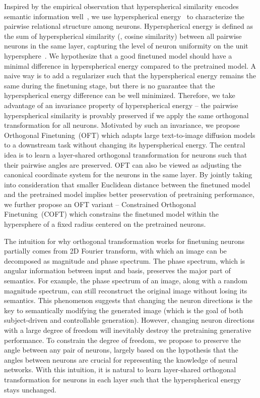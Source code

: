 Inspired by the empirical observation that hyperspherical similarity encodes semantic information well~\cite{liu2017deep,liu2018decoupled,chen2020angular}, we use hyperspherical energy~\cite{liu2018learning} to characterize the pairwise relational structure among neurons. Hyperspherical energy is defined as the sum of hyperspherical similarity (\eg, cosine similarity) between all pairwise neurons in the same layer, capturing the level of neuron uniformity on the unit hypersphere~\cite{liu2021learning}. We hypothesize that a good finetuned model should have a minimal difference in hyperspherical energy compared to the pretrained model. A naive way is to add a regularizer such that the hyperspherical energy remains the same during the finetuning stage, but there is no guarantee that the hyperspherical energy difference can be well minimized. Therefore, we take advantage of an invariance property of hyperspherical energy -- the pairwise hyperspherical similarity is provably preserved if we apply the same orthogonal transformation for all neurons. Motivated by such an invariance, we propose Orthogonal Finetuning~(OFT) which adapts large text-to-image diffusion models to a downstream task without changing its hyperspherical energy. The central idea is to learn a layer-shared orthogonal transformation for neurons such that their pairwise angles are preserved. OFT can also be viewed as adjusting the canonical coordinate system for the neurons in the same layer. By jointly taking into consideration that smaller Euclidean distance between the finetuned model and the pretrained model implies better preservation of pretraining performance, we further propose an OFT variant -- Constrained Orthogonal Finetuning~(COFT) which constrains the finetuned model within the hypersphere of a fixed radius centered on the pretrained neurons.



The intuition for why orthogonal transformation works for finetuning neurons partially comes from 2D Fourier transform, with which an image can be decomposed as magnitude and phase spectrum. The phase spectrum, which is angular information between input and basis, preserves the major part of semantics. For example, the phase spectrum of an image, along with a random magnitude spectrum, can still reconstruct the original image without losing its semantics. This phenomenon suggests that changing the neuron directions is the key to semantically modifying the generated image (which is the goal of both subject-driven and controllable generation). However, changing neuron directions with a large degree of freedom will inevitably destroy the pretraining generative performance. To constrain the degree of freedom, we propose to preserve the angle between any pair of neurons, largely based on the hypothesis that the angles between neurons are crucial for representing the knowledge of neural networks. With this intuition, it is natural to learn layer-shared orthogonal transformation for neurons in each layer such that the hyperspherical energy stays unchanged.

